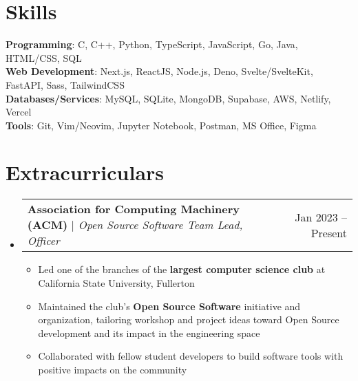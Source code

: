 \documentclass[letterpaper,11pt]{article}
\makeatletter
\newcommand{\resumeItem}[1]{
  \item\small{
    {#1 \vspace{-2pt}}
  }
}
\newcommand{\resumeProjectHeading}[2]{
  \item
  \begin{tabular*}{0.97\textwidth}{l@{\extracolsep{\fill}}r}
    \small#1 & #2 \\
  \end{tabular*}\vspace{-7pt}
}
\newcommand{\resumeSubHeadingListStart}{\begin{itemize}[leftmargin=0.15in,
      label={}]}
\newcommand{\resumeSubHeadingListEnd}{\end{itemize}}
\newcommand{\resumeItemListStart}{\begin{itemize}}
\newcommand{\resumeItemListEnd}{\end{itemize}\vspace{-5pt}}
\makeatother
\begin{document}
\section{Skills}
\begin{itemize}[leftmargin=0.15in, label={}]
  \small{\item{
    \textbf{Programming}{: C, C++, Python, TypeScript, JavaScript, Go, Java,
      HTML/CSS, SQL} \\
    \textbf{Web Development}{: Next.js, ReactJS, Node.js, Deno,
      Svelte/SvelteKit, FastAPI, Sass, TailwindCSS} \\
    \textbf{Databases/Services}{: MySQL, SQLite, MongoDB, Supabase, AWS,
      Netlify, Vercel} \\
    \textbf{Tools}{: Git, Vim/Neovim, Jupyter Notebook, Postman, MS Office,
      Figma}
  }}
\end{itemize}

\section{Extracurriculars}
\resumeSubHeadingListStart
\resumeProjectHeading
{\textbf{Association for Computing Machinery (ACM)} $|$
  \footnotesize\emph{Open Source Software Team Lead, Officer}}{Jan 2023
  -- Present}
\resumeItemListStart
\resumeItem{Led one of the branches of the \textbf{largest computer
    science club} at California State University, Fullerton}
\resumeItem{Maintained the club's \textbf{Open Source Software}
  initiative and organization, tailoring workshop and project ideas toward Open
  Source development and its impact in the engineering space}
\resumeItem{Collaborated with fellow student developers to build
  software tools with positive impacts on the community}
\resumeItemListEnd
\resumeSubHeadingListEnd
\end{document}

